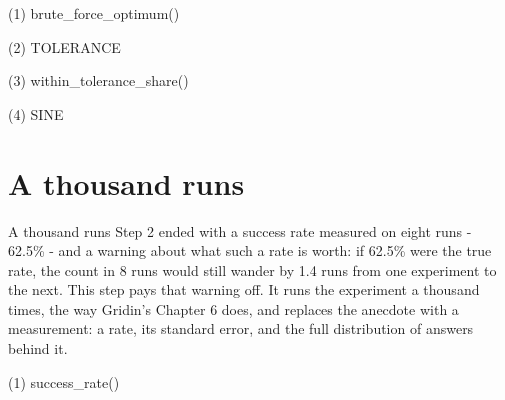 \begin{frame}[fragile]{(1) brute\_force\_optimum()}

\end{frame}

\begin{frame}[fragile]{(2) TOLERANCE}

\end{frame}

\begin{frame}[fragile]{(3) within\_tolerance\_share()}

\end{frame}

\begin{frame}[fragile]{(4) SINE}

\end{frame}


\section{A thousand runs}

\begin{frame}{A thousand runs}
Step 2 ended with a success rate measured on eight runs - 62.5\% - and a
warning about what such a rate is worth: if 62.5\% were the true rate, the
count in 8 runs would still wander by 1.4 runs from one experiment to the
next. This step pays that warning off. It runs the experiment a thousand
times, the way Gridin's Chapter 6 does, and replaces the anecdote with a
measurement: a rate, its standard error, and the full distribution of
answers behind it.
\end{frame}

\begin{frame}[fragile]{(1) success\_rate()}

\end{frame}

